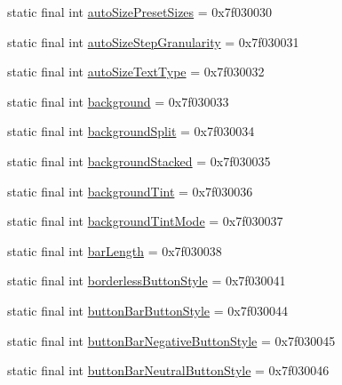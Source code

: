 \begin{DoxyCompactItemize}
\item 
static final int \mbox{\hyperlink{classcom_1_1synnapps_1_1carouselview_1_1_r_1_1attr_adf3aa4b09689cbbac85a08ecc5d3444f}{auto\+Size\+Preset\+Sizes}} = 0x7f030030
\item 
static final int \mbox{\hyperlink{classcom_1_1synnapps_1_1carouselview_1_1_r_1_1attr_a5edc2b3ff3ffb91df68ee355ee5cf501}{auto\+Size\+Step\+Granularity}} = 0x7f030031
\item 
static final int \mbox{\hyperlink{classcom_1_1synnapps_1_1carouselview_1_1_r_1_1attr_a52289f1adf85eb4c15f7b57d8c814bc3}{auto\+Size\+Text\+Type}} = 0x7f030032
\item 
static final int \mbox{\hyperlink{classcom_1_1synnapps_1_1carouselview_1_1_r_1_1attr_aca3ac53f8b3bddec75c9d28c488c81e7}{background}} = 0x7f030033
\item 
static final int \mbox{\hyperlink{classcom_1_1synnapps_1_1carouselview_1_1_r_1_1attr_a1ac60a4edc7a432c086728bad9f96fbd}{background\+Split}} = 0x7f030034
\item 
static final int \mbox{\hyperlink{classcom_1_1synnapps_1_1carouselview_1_1_r_1_1attr_a30ecc96829204881a46a141411f5fc12}{background\+Stacked}} = 0x7f030035
\item 
static final int \mbox{\hyperlink{classcom_1_1synnapps_1_1carouselview_1_1_r_1_1attr_a220fc87bd66138b5207d8d7fbf1bc2ef}{background\+Tint}} = 0x7f030036
\item 
static final int \mbox{\hyperlink{classcom_1_1synnapps_1_1carouselview_1_1_r_1_1attr_aba28975796ce30c0ff05c5017e6d8f77}{background\+Tint\+Mode}} = 0x7f030037
\item 
static final int \mbox{\hyperlink{classcom_1_1synnapps_1_1carouselview_1_1_r_1_1attr_a0ac94a11a8b3ab2a32ba3e3da73773fa}{bar\+Length}} = 0x7f030038
\item 
static final int \mbox{\hyperlink{classcom_1_1synnapps_1_1carouselview_1_1_r_1_1attr_a063c3e899e4b0d23ba321420b4ab5cbd}{borderless\+Button\+Style}} = 0x7f030041
\item 
static final int \mbox{\hyperlink{classcom_1_1synnapps_1_1carouselview_1_1_r_1_1attr_a7021e820ef4be634b33ded3df1657bf3}{button\+Bar\+Button\+Style}} = 0x7f030044
\item 
static final int \mbox{\hyperlink{classcom_1_1synnapps_1_1carouselview_1_1_r_1_1attr_adc6c6da364f3dd252adb6fb50b0b9fa9}{button\+Bar\+Negative\+Button\+Style}} = 0x7f030045
\item 
static final int \mbox{\hyperlink{classcom_1_1synnapps_1_1carouselview_1_1_r_1_1attr_a356e6fda8b27d389288862bdbce114b9}{button\+Bar\+Neutral\+Button\+Style}} = 0x7f030046

\end{DoxyCompactItemize}
